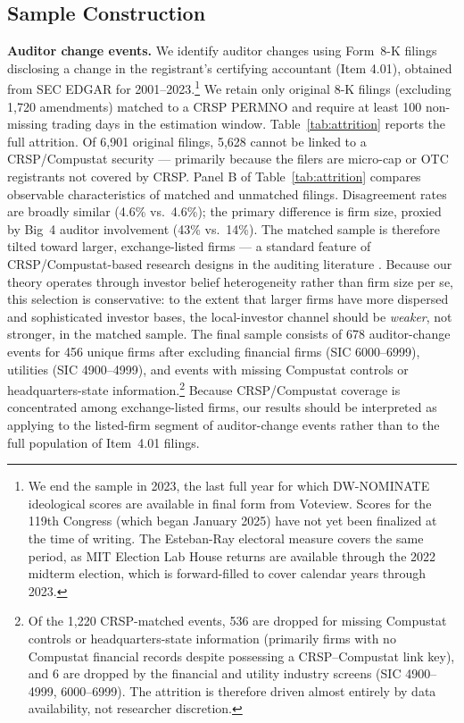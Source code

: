 \documentclass[12pt]{article}
\begin{document}
\subsection{Sample Construction}

\textbf{Auditor change events.} We identify auditor changes using Form~8-K
filings disclosing a change in the registrant's certifying accountant (Item
4.01), obtained from SEC EDGAR for 2001--2023.\footnote{We end the sample in
2023, the last full year for which DW-NOMINATE ideological scores are
available in final form from Voteview. Scores for the 119th Congress (which
began January 2025) have not yet been finalized at the time of writing. The
Esteban-Ray electoral measure covers the same period, as MIT Election Lab
House returns are available through the 2022 midterm election, which is
forward-filled to cover calendar years through 2023.} We retain only
original 8-K filings (excluding 1,720 amendments) matched to a CRSP PERMNO
and require at least 100 non-missing trading days in the estimation window.
Table~\ref{tab:attrition} reports the full attrition. Of 6,901 original
filings, 5,628 cannot be linked to a CRSP/Compustat security --- primarily
because the filers are micro-cap or OTC registrants not covered by
CRSP. Panel B of Table~\ref{tab:attrition} compares observable
characteristics of matched and unmatched filings. Disagreement rates are
broadly similar (4.6\% vs.\ 4.6\%); the primary difference is firm size,
proxied by Big~4 auditor involvement (43\% vs.\ 14\%). The matched sample
is therefore tilted toward larger, exchange-listed firms --- a standard
feature of CRSP/Compustat-based research designs in the auditing literature
\citep{defond2014}. Because our theory operates through investor belief
heterogeneity rather than firm size per se, this selection is conservative:
to the extent that larger firms have more dispersed and sophisticated
investor bases, the local-investor channel should be \emph{weaker}, not
stronger, in the matched sample. The final sample consists
of 678 auditor-change events for 456 unique firms after excluding financial
firms (SIC 6000--6999), utilities (SIC 4900--4999), and events with missing
Compustat controls or headquarters-state
information.\footnote{Of the 1,220 CRSP-matched events, 536 are dropped
for missing Compustat controls or headquarters-state information
(primarily firms with no Compustat financial records despite possessing a
CRSP--Compustat link key), and 6 are dropped by the financial and utility
industry screens (SIC 4900--4999, 6000--6999). The attrition is therefore
driven almost entirely by data availability, not researcher discretion.}
Because CRSP/Compustat coverage is concentrated among exchange-listed
firms, our results should be interpreted as applying to the listed-firm
segment of auditor-change events rather than to the full population of
Item~4.01 filings.
\end{document}
